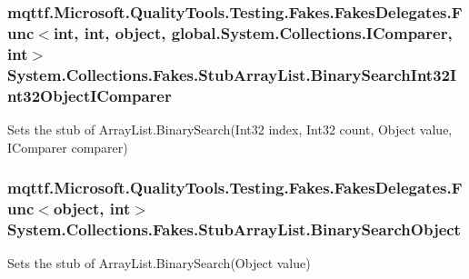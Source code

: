 \hypertarget{class_system_1_1_collections_1_1_fakes_1_1_stub_array_list_a78355e63c537b20d4dd31360bcbe39d3}{
\subsubsection[{Binary\-Search\-Int32\-Int32\-Object\-I\-Comparer}]{\setlength{\rightskip}{0pt plus 5cm}mqttf.\-Microsoft.\-Quality\-Tools.\-Testing.\-Fakes.\-Fakes\-Delegates.\-Func$<$int, int, object, global.\-System.\-Collections.\-I\-Comparer, int$>$ System.\-Collections.\-Fakes.\-Stub\-Array\-List.\-Binary\-Search\-Int32\-Int32\-Object\-I\-Comparer}}\label{class_system_1_1_collections_1_1_fakes_1_1_stub_array_list_a78355e63c537b20d4dd31360bcbe39d3}


Sets the stub of Array\-List.\-Binary\-Search(\-Int32 index, Int32 count, Object value, I\-Comparer comparer)

\hypertarget{class_system_1_1_collections_1_1_fakes_1_1_stub_array_list_a740609c3762970b663b77040c50b82a0}{
\subsubsection[{Binary\-Search\-Object}]{\setlength{\rightskip}{0pt plus 5cm}mqttf.\-Microsoft.\-Quality\-Tools.\-Testing.\-Fakes.\-Fakes\-Delegates.\-Func$<$object, int$>$ System.\-Collections.\-Fakes.\-Stub\-Array\-List.\-Binary\-Search\-Object}}\label{class_system_1_1_collections_1_1_fakes_1_1_stub_array_list_a740609c3762970b663b77040c50b82a0}


Sets the stub of Array\-List.\-Binary\-Search(\-Object value)

